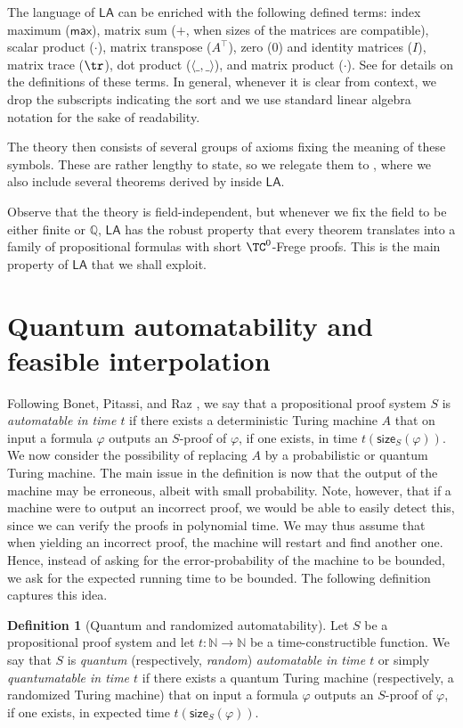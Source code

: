 \documentclass[11pt]{article}
\newcommand{\LA}{\mathsf{LA}}
\theoremstyle{definition}
\newtheorem{definition}{Definition}[section]
\theoremstyle{plain}
\theoremstyle{remark}
\newcommand{\bQ}{\mathbb{Q}}
\let\autocite\cite\let\textcite\citet
\begin{document}
The language of $\LA$ can be enriched with the following defined terms: index maximum ($\mathsf{max}$), matrix sum ($+$, when sizes of the matrices are compatible), scalar product ($\cdot$), matrix transpose ($A^\intercal$), zero ($0$) and identity matrices ($I$), matrix trace ($\tr$), dot product ($\langle \_, \_\rangle$), and matrix product ($\cdot$). See \autocite[Section 2.1]{cooksoltys} for details on the definitions of these terms. In general, whenever it is clear from context, we drop the subscripts indicating the sort and we use standard linear algebra notation for the sake of readability.

The theory then consists of several groups of axioms fixing the meaning of these symbols. These are rather lengthy to state, so we relegate them to , where we also include several theorems derived by \citeauthor{cooksoltys} inside $\LA$.

Observe that the theory is field-independent, but whenever we fix the field to be either finite or $\bQ$, $\LA$ has the robust property that every theorem translates into a family of propositional formulas with short $\TC^0$-Frege proofs. This is the main property of $\LA$ that we shall exploit.

\section{Quantum automatability and feasible interpolation}
\label{sec:qauto}

Following Bonet, Pitassi, and Raz \cite{BPR1997}, we say that a propositional proof system $S$ is \emph{automatable in time $t$} if there exists a deterministic Turing machine $A$ that on input a formula $\varphi$ outputs an $S$-proof of $\varphi$, if one exists, in time $t(\mathsf{size}_S(\varphi))$. We now consider the possibility of replacing $A$ by a probabilistic or quantum Turing machine. The main issue in the definition is now that the output of the machine may be erroneous, albeit with small probability. Note, however, that if a machine were to output an incorrect proof, we would be able to easily detect this, since we can verify the proofs in polynomial time. We may thus assume that when yielding an incorrect proof, the machine will restart and find another one. Hence, instead of asking for the error-probability of the machine to be bounded, we ask for the expected running time to be bounded. The following definition captures this idea.

\begin{definition}[Quantum and randomized automatability]
\label{def:q-aut}
Let $S$ be a propositional proof system and let $t : \mathbb{N} \to \mathbb{N}$ be a time-constructible function. We say that $S$ is \emph{quantum} (respectively, \emph{random}) \emph{automatable in time $t$} or simply \emph{quantumatable in time $t$} if there exists a quantum Turing machine (respectively, a randomized Turing machine) that on input a formula $\varphi$ outputs an $S$-proof of $\varphi$, if one exists, in expected time $t(\mathsf{size}_S(\varphi))$.
\end{definition}
\end{document}
